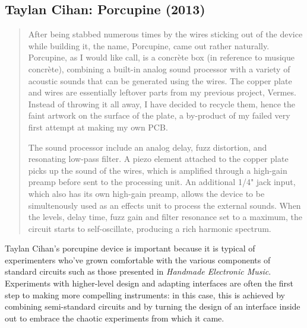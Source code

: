 



\subsection{Taylan Cihan: Porcupine (2013)}

\begin{quote}
	
	After being stabbed numerous times by the wires sticking out of the device while building it, the name, Porcupine, came out rather naturally. Porcupine, as I would like call, is a concrète box (in reference to musique concrète), combining a built-in analog sound processor with a variety of acoustic sounds that can be generated using the wires. The copper plate and wires are essentially leftover parts from my previous project, Vermes. Instead of throwing it all away, I have decided to recycle them, hence the faint artwork on the surface of the plate, a by-product of my failed very first attempt at making my own PCB.

	The sound processor include an analog delay, fuzz distortion, and resonating low-pass filter. A piezo element attached to the copper plate picks up the sound of the wires, which is amplified through a high-gain preamp before sent to the processing unit. An additional 1/4" jack input, which also has its own high-gain preamp, allows the device to be simultenously used as an effects unit to process the external sounds. When the levels, delay time, fuzz gain and filter resonance set to a maximum, the circuit starts to self-oscillate, producing a rich harmonic spectrum.
	
	\end{quote}
	
	\citep{cihan2015}
	

Taylan Cihan's porcupine device is important because it is typical of experimenters who've grown comfortable with the various components of standard circuits such as those presented in \emph{Handmade Electronic Music}. Experiments with higher-level design and adapting interfaces are often the first step to making more compelling instruments: in this case, this is achieved by combining semi-standard circuits and by turning the design of an interface inside out to embrace the chaotic experiments from which it came. 

